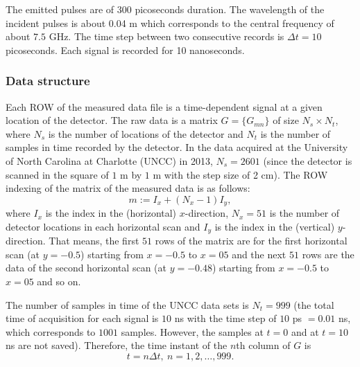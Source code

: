 \documentclass[a4paper,12pt]{article}
\begin{document}
The emitted pulses are of 300 picoseconds duration. The
wavelength of the incident pulses is about 0.04 m which corresponds to the central frequency of about $7.5$ GHz. The time step between two consecutive records is $\Delta t=10$ picoseconds. Each signal is recorded for 10 nanoseconds.

\subsubsection{Data structure}
Each ROW of the measured data file is a time-dependent signal at a given location of the detector. The raw data is a matrix $G = \{G_{mn}\}$ of size $N_s\times N_t$, where $N_s$ is the number of locations of the detector and $N_t$ is the number of samples in time recorded by the detector. In the data acquired at the University of North Carolina at Charlotte (UNCC) in 2013, $N_s = 2601$ (since the detector is scanned in the square of $1$ m by $1$ m with the step size of 2 cm). The ROW indexing of the matrix of the measured data is as follows:
$$
m := I_x + (N_x -1)I_y,
$$
where $I_x$ is the index in the (horizontal) $x$-direction, $N_x = 51 $ is the number of detector locations in each horizontal scan and $I_y$ is the index in the (vertical) $y$-direction. That means, the first $51$ rows of the matrix are for the first horizontal scan (at $y = -0.5$) starting from $x = -0.5$ to $x = 05$ and the next $51$ rows are the data of the second horizontal scan (at $y = -0.48$) starting from  $x = -0.5$ to $x = 05$ and so on. 

The number of samples in time of the UNCC data sets is $N_t = 999$ (the total time of acquisition for each signal is $10$ ns with the time step of $10$ ps  $ = 0.01$ ns, which corresponds to $1001$ samples. However, the samples at $t = 0$ and at $t = 10$ ns are not saved). Therefore, the time instant of the $n$th column of $G$ is  
$$t = n\Delta t , \ n = 1, 2,\dots, 999.$$
\end{document}
